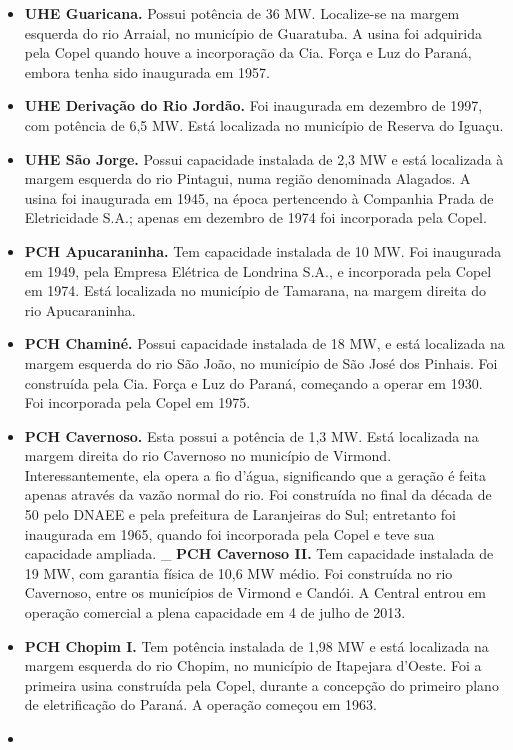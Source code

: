 \documentclass[grad,numbers]{coppe}
\begin{document}
\begin{itemize}
  \item
    \textbf{UHE Guaricana.} Possui potência de 36 MW. Localize-se na margem esquerda do rio Arraial, no município de Guaratuba. A usina foi adquirida pela Copel quando houve a incorporação da Cia. Força e Luz do Paraná, embora tenha sido inaugurada em 1957.
  \item
    \textbf{UHE Derivação do Rio Jordão.} Foi inaugurada em dezembro de 1997, com potência de 6,5 MW. Está localizada no município de Reserva do Iguaçu.
  \item
    \textbf{UHE São Jorge.} Possui capacidade instalada de 2,3 MW e está localizada à margem esquerda do rio Pintagui, numa região denominada Alagados. A usina foi inaugurada em 1945, na época pertencendo à Companhia Prada de Eletricidade S.A.; apenas em dezembro de 1974 foi incorporada pela Copel.
  \item
    \textbf{PCH Apucaraninha.} Tem capacidade instalada de 10 MW. Foi inaugurada em 1949, pela Empresa Elétrica de Londrina S.A., e incorporada pela Copel em 1974. Está localizada no município de Tamarana, na margem direita do rio Apucaraninha.
  \item
    \textbf{PCH Chaminé.} Possui capacidade instalada de 18 MW, e está localizada na margem esquerda do rio São João, no município de São José dos Pinhais. Foi construída pela Cia. Força e Luz do Paraná, começando a operar em 1930. Foi incorporada pela Copel em 1975.
  \item
    \textbf{PCH Cavernoso.} Esta possui a potência de 1,3 MW. Está localizada na margem direita do rio Cavernoso no município de Virmond. Interessantemente, ela opera a fio d'água, significando que a geração é feita apenas através da vazão normal do rio. Foi construída no final da década de 50 pelo DNAEE e pela prefeitura de Laranjeiras do Sul; entretanto foi inaugurada em 1965, quando foi incorporada pela Copel e teve sua capacidade ampliada.
    \_ \textbf{PCH Cavernoso II.} Tem capacidade instalada de 19 MW, com garantia física de 10,6 MW médio. Foi construída no rio Cavernoso, entre os municípios de Virmond e Candói. A Central entrou em operação comercial a plena capacidade em 4 de julho de 2013.
  \item
    \textbf{PCH Chopim I.} Tem potência instalada de 1,98 MW e está localizada na margem esquerda do rio Chopim, no município de Itapejara d'Oeste. Foi a primeira usina construída pela Copel, durante a concepção do primeiro plano de eletrificação do Paraná. A operação começou em 1963.
  \item

\end{itemize}
\end{document}
